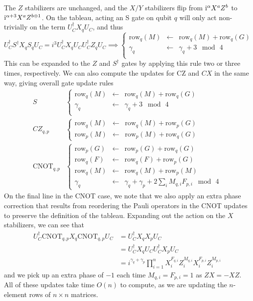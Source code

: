 The $Z$ stabilizers are unchanged, and the $X/Y$ stabilizers flip from $\mathrm{i}^{\alpha}X^{a}Z^{b}$ to $\mathrm{i}^{\alpha+3}X^{a}Z^{b\oplus 1}$. On the tableau, acting an S gate on qubit $q$ will only act non-trivially on the term $U_{C}^{\dagger}X_{q}U_{C}$, and thus
\[
U_{C}^{\dagger}S^{\dagger}X_{q}S_{q}U_{C} = i^{3}U_{C}^{\dagger}X_{q}U_{C}U_{C}^{\dagger}Z_{q}U_{C} \implies \left\{
\begin{array}{rcl}
\text{row}_{q}(M)  & \gets & \text{row}_{q}(M)+\text{row}_{q}(G) \\
\gamma_{q} & \gets & \gamma_{q} + 3\;\bmod\,4 \\
\end{array}\right.
\]
This can be expanded to the $Z$ and $S^{\dagger}$ gates by applying this rule two or three times, respectively. We can also compute the updates for CZ and $CX$ in the same way, giving overall gate update rules
\begin{align}
S & \left\{
\begin{array}{rcl}
\text{row}_{q}(M)  & \gets & \text{row}_{q}(M)+\text{row}_{q}(G) \\
\gamma_{q} & \gets & \gamma_{q} + 3\;\bmod\,4 \\
\end{array}\right. \nonumber \\
CZ_{q,p} & \left\{
\begin{array}{rcl}
\text{row}_{q}(M) & \gets & \text{row}_{q}(M) + \text{row}_{p}(G) \\
\text{row}_{p}(M) & \gets & \text{row}_{p}(M) + \text{row}_{q}(G)
\end{array} \right. \nonumber \\ 
\text{CNOT}_{q,p} & \left\{
\begin{array}{rcl}
\text{row}_{p}(G) & \gets & \text{row}_{p}(G) + \text{row}_{q}(G)\\
\text{row}_{q}(F) & \gets & \text{row}_{q}(F) + \text{row}_{p}(G)\\
\text{row}_{q}(M) & \gets & \text{row}_{q}(M) + \text{row}_{p}(M)\\
\gamma_{q} & \gets & \gamma_{q}+\gamma_{p} + 2 \sum_{i}M_{q,i}F_{p,i} \;\bmod\,4
\end{array}\right.
\end{align}
On the final line in the CNOT case, we note that we also apply an extra phase correction that results from reordering the Pauli operators in the CNOT updates to preserve the definition of the tableau. Expanding out the action on the $X$ stabilizers, we can see that
\begin{align*}
U_{C}^{\dagger}\text{CNOT}_{q,p}X_{q}\text{CNOT}_{q,p}U_{C} &= U_{C}^{\dagger}X_{q}X_{p}U_{C} \\
&= U_{C}^{\dagger}X_{q}U_{C}U_{C}^{\dagger}X_{p}U_{C} \\
&= i^{\gamma_{q}+\gamma_{p}}\prod_{i=1}^{n}X_{i}^{F_{q,i}}Z_{i}^{M_{q,i}}X_{i}^{F_{p,i}}Z_{i}^{M_{p,i}}
\end{align*}
and we pick up an extra phase of $-1$ each time $M_{q,i}=F_{p,i}=1$ as $ZX=-XZ$. All of these updates take time $O(n)$ to compute, as we are updating the $n$-element rows of $n\times n$ matrices.
